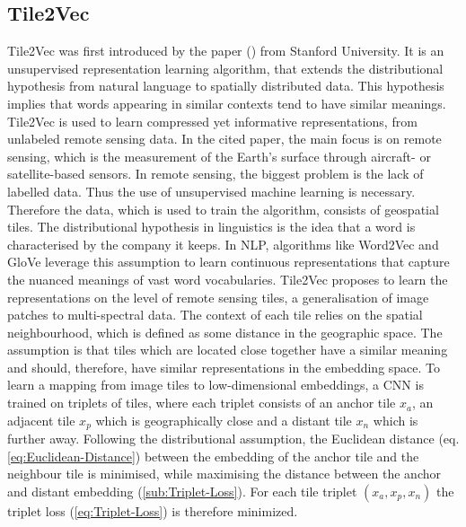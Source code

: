 \subsection{Tile2Vec}
\label{sub:Tile2Vec}
Tile2Vec was first introduced by the paper (\cite{jean_tile2vec_2018}) from Stanford University. It is an unsupervised representation learning algorithm, that extends the distributional hypothesis from natural language to spatially distributed data. This hypothesis implies that words appearing in similar contexts tend to have similar meanings. Tile2Vec is used to learn compressed yet informative representations, from unlabeled remote sensing data.
\newline
\newline
In the cited paper, the main focus is on remote sensing, which is the measurement of the Earth's surface through aircraft- or satellite-based sensors. In remote sensing, the biggest problem is the lack of labelled data. Thus the use of unsupervised machine learning is necessary. Therefore the data, which is used to train the algorithm, consists of geospatial tiles.
\newline
\newline
The distributional hypothesis in linguistics is the idea that \flqq a word is characterised by the company it keeps\frqq. In \gls{NLP}, algorithms like Word2Vec and GloVe leverage this assumption to learn continuous representations that capture the nuanced meanings of vast word vocabularies.
\newline
\newline
Tile2Vec proposes to learn the representations on the level of remote sensing tiles, a generalisation of image patches to multi-spectral data. The context of each tile relies on the spatial neighbourhood, which is defined as some distance in the geographic space. The assumption is that tiles which are located close together have a similar meaning and should, therefore, have similar representations in the embedding space.
\newline
\newline
To learn a mapping from image tiles to low-dimensional embeddings, a \gls{CNN} is trained on triplets of tiles, where each triplet consists of an anchor tile $x_a$, an adjacent tile $x_p$ which is geographically close and a distant tile $x_n$ which is further away. Following the distributional assumption, the Euclidean distance (eq. \ref{eq:Euclidean-Distance}) between the embedding of the anchor tile and the neighbour tile is minimised, while maximising the distance between the anchor and distant embedding (\ref{sub:Triplet-Loss}). For each tile triplet $(x_a, x_p, x_n)$ the triplet loss (\ref{eq:Triplet-Loss}) is therefore minimized.
